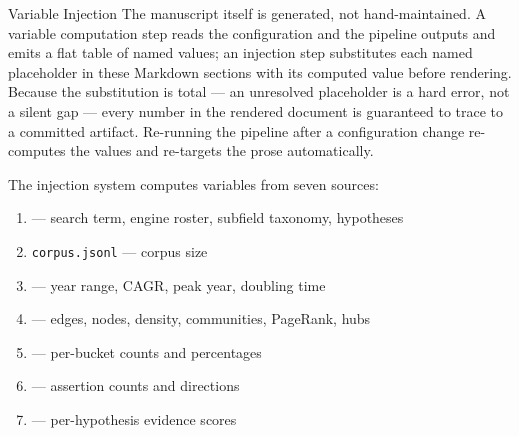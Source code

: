 \documentclass[
  ignorenonframetext,
]{beamer}
\providecommand{\tightlist}{%
  \setlength{\itemsep}{0pt}\setlength{\parskip}{0pt}}
\begin{document}
\begin{frame}{Variable Injection}
\protect{}\label{variable-injection}
The manuscript itself is generated, not hand-maintained. A variable
computation step reads the configuration and the pipeline outputs and
emits a flat table of named values; an injection step substitutes each
named placeholder in these Markdown sections with its computed value
before rendering. Because the substitution is total --- an unresolved
placeholder is a hard error, not a silent gap --- every number in the
rendered document is guaranteed to trace to a committed artifact.
Re-running the pipeline after a configuration change re-computes the
values and re-targets the prose automatically.

The injection system computes variables from seven sources:

\begin{enumerate}
\tightlist
\item
   --- search term, engine roster,
  subfield taxonomy, hypotheses
\item
  \texttt{corpus.jsonl} --- corpus size
\item
   --- year range, CAGR, peak year,
  doubling time
\item
   --- edges, nodes, density,
  communities, PageRank, hubs
\item
   --- per-bucket counts and
  percentages
\item
   --- assertion counts and directions
\item
   --- per-hypothesis evidence scores
\end{enumerate}
\end{frame}
\end{document}
